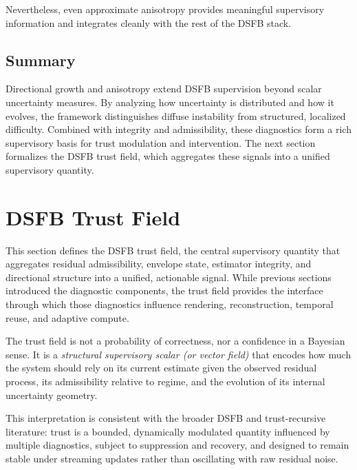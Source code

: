 \documentclass[11pt,letterpaper]{article}
\theoremstyle{gcresult}
\theoremstyle{definition}
\begin{document}
Nevertheless, even approximate anisotropy provides meaningful supervisory information and integrates cleanly with the rest of the DSFB stack.


\subsection{Summary}

Directional growth and anisotropy extend DSFB supervision beyond scalar uncertainty measures. By analyzing how uncertainty is distributed and how it evolves, the framework distinguishes diffuse instability from structured, localized difficulty. Combined with integrity and admissibility, these diagnostics form a rich supervisory basis for trust modulation and intervention. The next section formalizes the DSFB trust field, which aggregates these signals into a unified supervisory quantity.





\section{DSFB Trust Field}
\label{sec:trustfield}

This section defines the DSFB trust field, the central supervisory quantity that aggregates residual admissibility, envelope state, estimator integrity, and directional structure into a unified, actionable signal. While previous sections introduced the diagnostic components, the trust field provides the interface through which those diagnostics influence rendering, reconstruction, temporal reuse, and adaptive compute.

The trust field is not a probability of correctness, nor a confidence in a Bayesian sense. It is a \emph{structural supervisory scalar (or vector field)} that encodes how much the system should rely on its current estimate given the observed residual process, its admissibility relative to regime, and the evolution of its internal uncertainty geometry.

This interpretation is consistent with the broader DSFB and trust-recursive literature: trust is a bounded, dynamically modulated quantity influenced by multiple diagnostics, subject to suppression and recovery, and designed to remain stable under streaming updates rather than oscillating with raw residual noise. 
\end{document}
